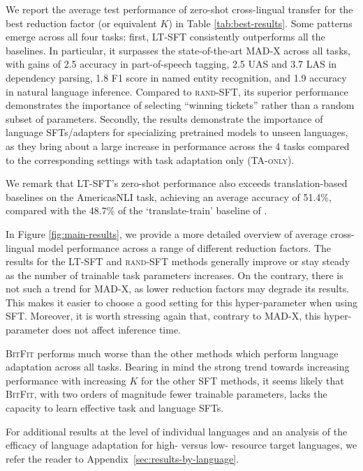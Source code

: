 We report the average test performance of zero-shot cross-lingual transfer for the best reduction factor (or equivalent $K$) in Table \ref{tab:best-results}. Some patterns emerge across all four tasks: first, {\textsc{LT-SFT}} consistently outperforms all the baselines. In particular, it surpasses the state-of-the-art {\textsc{MAD-X}} across all tasks, with gains of 2.5 accuracy in part-of-speech tagging, 2.5 UAS and 3.7 LAS in dependency parsing, 1.8 F1 score in named entity recognition, and 1.9 accuracy in natural language inference. Compared to {\textsc{rand-SFT}}, its superior performance demonstrates the importance of selecting ``winning tickets'' rather than a random subset of parameters. Secondly, the results demonstrate the importance of language SFTs/adapters for specializing pretrained models to unseen languages, as they bring about a large increase in performance across the 4 tasks compared to the corresponding settings with task adaptation only ({\textsc{TA-only}}).

We remark that LT-SFT's zero-shot performance also exceeds translation-based baselines on the AmericasNLI task, achieving an average accuracy of 51.4\%, compared with the 48.7\% of the `translate-train' baseline of \citet{ebrahimi-etal-2021-americasnli}.

In Figure \ref{fig:main-results}, we provide a more detailed overview of average cross-lingual model performance across a range of different reduction factors. The results for the {\textsc{LT-SFT}} and {\textsc{rand-SFT}} methods generally improve or stay steady as the number of trainable task parameters increases. On the contrary, there is not such a trend for {\textsc{MAD-X}}, as lower reduction factors may degrade its results. This makes it easier to choose a good setting for this hyper-parameter when using SFT. Moreover, it is worth stressing again that, contrary to {\textsc{MAD-X}}, this hyper-parameter does not affect inference time.

{\textsc{BitFit}} performs much worse than the other methods which perform language adaptation across all tasks. Bearing in mind the strong trend towards increasing performance with increasing $K$ for the other SFT methods, it seems likely that {\textsc{BitFit}}, with two orders of magnitude fewer trainable parameters, lacks the capacity to learn effective task and language SFTs.

For additional results at the level of individual languages and an analysis of the efficacy of language adaptation for high- versus low- resource target languages, we refer the reader to Appendix~\ref{sec:results-by-language}.


